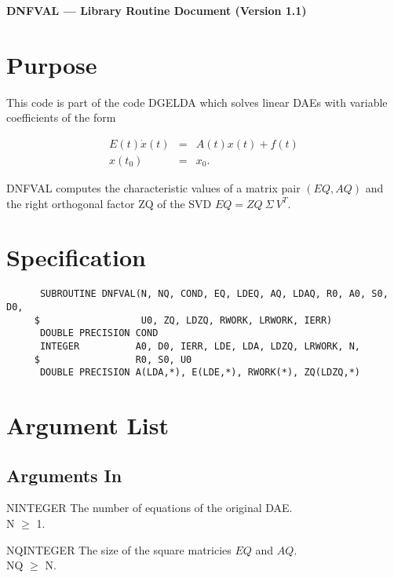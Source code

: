


\begin{center}
  {\bf DNFVAL ---  Library Routine Document (Version 1.1)}
\end{center}

\section{Purpose}

This code is part of the code DGELDA \cite{KunMRW95 }which solves
linear DAEs with variable coefficients of the form 

\begin{eqnarray*}
  E(t)\dot{x}(t) &=& A(t)x(t) + f(t)\\
  x(t_0) &=& x_0.
\end{eqnarray*}

DNFVAL computes the characteristic values of a matrix pair $(EQ, AQ)$
and the right orthogonal factor ZQ of the SVD $EQ = ZQ\ \Sigma\ V^T$.

\section{Specification}

\begin{verbatim}
      SUBROUTINE DNFVAL(N, NQ, COND, EQ, LDEQ, AQ, LDAQ, R0, A0, S0, D0,
     $                  U0, ZQ, LDZQ, RWORK, LRWORK, IERR)
      DOUBLE PRECISION COND
      INTEGER          A0, D0, IERR, LDE, LDA, LDZQ, LRWORK, N, 
     $                 R0, S0, U0 
      DOUBLE PRECISION A(LDA,*), E(LDE,*), RWORK(*), ZQ(LDZQ,*)
\end{verbatim}

\section{Argument List}

\subsection{Arguments In}

\begin{entry}{N}{INTEGER}
  The number of equations of the original DAE.\\
  N $\ge$ 1.
\end{entry}

\begin{entry}{NQ}{INTEGER}
  The size of the square matricies $EQ$ and $AQ$.\\
  NQ $\ge$ N.
\end{entry}

